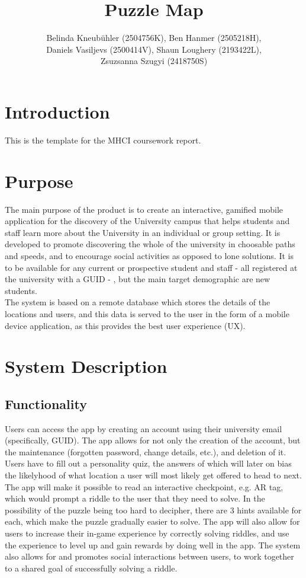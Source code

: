 \documentclass[10pt,twocolumn]{article} %
\author{
  Belinda Kneubühler (2504756K), Ben Hanmer (2505218H),\\
  Daniels Vasiljevs (2500414V), Shaun Loughery (2193422L),\\
  Zsuzsanna Szugyi (2418750S)}
\title{Puzzle Map}
\date{} %
\begin{document}
\maketitle


\section*{Introduction}

This is the template for the MHCI coursework report.

\section*{Purpose}

The main purpose of the product is to create an interactive, gamified mobile application for the discovery of the University campus that helps students and staff learn more about the University in an individual or group setting. It is developed to promote discovering the whole of the university in choosable paths and speeds,  and to encourage social activities as opposed to lone solutions. It is to be available for any current or prospective student and staff - all registered at the university with a GUID - , but the main target demographic are new students.\\
The system is based on a remote database which stores the details of the locations and users, and this data is served to the user in the form of a mobile device application, as this provides the best user experience (UX).

\section*{System Description}

\subsection*{Functionality}
Users can access the app by creating an account using their university email (specifically, GUID). The app allows for not only the creation of the account, but the maintenance (forgotten password, change details, etc.), and deletion of it. Users have to fill out a personality quiz, the answers of which will later on bias the likelyhood of what location a user will most likely get offered to head to next. The app will make it possible to read an interactive checkpoint, e.g. AR tag, which would prompt a riddle to the user that they need to solve. In the possibility of the puzzle being too hard to decipher, there are 3 hints available for each, which make the puzzle gradually easier to solve. The app will also allow for users to increase their in-game experience by correctly solving riddles, and use the experience to level up and gain rewards by doing well in the app. The system also allows for and promotes social interactions between users, to work together to a shared goal of successfully solving a riddle.
\end{document}
